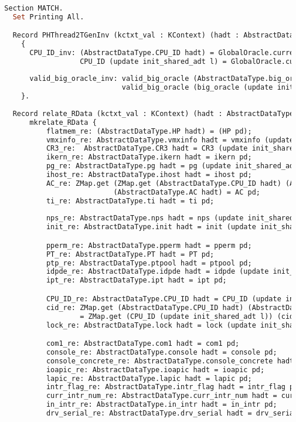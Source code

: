 \begin{lstlisting}[language=Caml]

  Section MATCH.
    Set Printing All.

    Record PHThread2TGenInv (kctxt_val : KContext) (hadt : AbstractDataType.RData) (l : Log) (pd : dproc) :=
      { 
        CPU_ID_inv: (AbstractDataType.CPU_ID hadt) = GlobalOracle.current_CPU_ID /\
                    CPU_ID (update init_shared_adt l) = GlobalOracle.current_CPU_ID;
        
        valid_big_oracle_inv: valid_big_oracle (AbstractDataType.big_oracle hadt) /\
                              valid_big_oracle (big_oracle (update init_shared_adt l))
      }.
    
    Record relate_RData (kctxt_val : KContext) (hadt : AbstractDataType.RData) (l : Log) (pd : dproc) :=
        mkrelate_RData {
            flatmem_re: (AbstractDataType.HP hadt) = (HP pd);
            vmxinfo_re: AbstractDataType.vmxinfo hadt = vmxinfo (update init_shared_adt l);
            CR3_re:  AbstractDataType.CR3 hadt = CR3 (update init_shared_adt l);
            ikern_re: AbstractDataType.ikern hadt = ikern pd;
            pg_re: AbstractDataType.pg hadt = pg (update init_shared_adt l);
            ihost_re: AbstractDataType.ihost hadt = ihost pd;
            AC_re: ZMap.get (ZMap.get (AbstractDataType.CPU_ID hadt) (AbstractDataType.cid hadt))
                            (AbstractDataType.AC hadt) = AC pd;
            ti_re: AbstractDataType.ti hadt = ti pd;
            
            nps_re: AbstractDataType.nps hadt = nps (update init_shared_adt l);
            init_re: AbstractDataType.init hadt = init (update init_shared_adt l);

            pperm_re: AbstractDataType.pperm hadt = pperm pd;
            PT_re: AbstractDataType.PT hadt = PT pd;
            ptp_re: AbstractDataType.ptpool hadt = ptpool pd;
            idpde_re: AbstractDataType.idpde hadt = idpde (update init_shared_adt l);
            ipt_re: AbstractDataType.ipt hadt = ipt pd;

            CPU_ID_re: AbstractDataType.CPU_ID hadt = CPU_ID (update init_shared_adt l);
            cid_re: ZMap.get (AbstractDataType.CPU_ID hadt) (AbstractDataType.cid hadt)
                    = ZMap.get (CPU_ID (update init_shared_adt l)) (cid (update init_shared_adt l));
            lock_re: AbstractDataType.lock hadt = lock (update init_shared_adt l);

            com1_re: AbstractDataType.com1 hadt = com1 pd;
            console_re: AbstractDataType.console hadt = console pd;
            console_concrete_re: AbstractDataType.console_concrete hadt = console_concrete pd;
            ioapic_re: AbstractDataType.ioapic hadt = ioapic pd;
            lapic_re: AbstractDataType.lapic hadt = lapic pd;
            intr_flag_re: AbstractDataType.intr_flag hadt = intr_flag pd;
            curr_intr_num_re: AbstractDataType.curr_intr_num hadt = curr_intr_num pd;
            in_intr_re: AbstractDataType.in_intr hadt = in_intr pd;
            drv_serial_re: AbstractDataType.drv_serial hadt = drv_serial pd;


\end{lstlisting}
